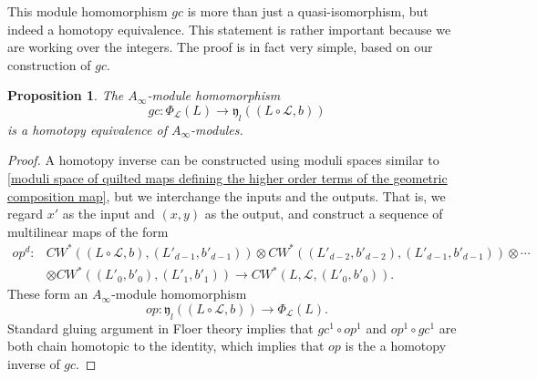 \documentclass{amsart}
\newtheorem{proposition}[theorem]{Proposition}
\numberwithin{equation}{section}
\numberwithin{figure}{section}
\begin{document}
	This module homomorphism $gc$ is more than just a quasi-isomorphism, but indeed a homotopy equivalence. This statement is rather important because we are working over the integers. The proof is in fact very simple, based on our construction of $gc$. \par

\begin{proposition}
	The $A_{\infty}$-module homomorphism
\begin{equation*}
gc: \Phi_{\mathcal{L}}(L) \to \mathfrak{y}_{l}((L \circ \mathcal{L}, b))
\end{equation*}
is a homotopy equivalence of $A_{\infty}$-modules.
\end{proposition}
\begin{proof}
	A homotopy inverse can be constructed using moduli spaces similar to \eqref{moduli space of quilted maps defining the higher order terms of the geometric composition map}, but we interchange the inputs and the outputs. That is, we regard $x'$ as the input and $(x, y)$ as the output, and construct a sequence of multilinear maps of the form
\begin{equation}
\begin{split}
op^{d}: & CW^{*}((L \circ \mathcal{L}, b), (L'_{d-1}, b'_{d-1})) \otimes CW^{*}((L'_{d-2}, b'_{d-2}), (L'_{d-1}, b'_{d-1})) \otimes \cdots \\
&\otimes CW^{*}((L'_{0}, b'_{0}), (L'_{1}, b'_{1})) \to CW^{*}(L, \mathcal{L}, (L'_{0}, b'_{0})).
\end{split}
\end{equation}
These form an $A_{\infty}$-module homomorphism
\begin{equation*}
op: \mathfrak{y}_{l}((L \circ \mathcal{L}, b)) \to \Phi_{\mathcal{L}}(L).
\end{equation*}
Standard gluing argument in Floer theory implies that $gc^{1} \circ op^{1}$ and $op^{1} \circ gc^{1}$ are both chain homotopic to the identity, which implies that $op$ is the a homotopy inverse of $gc$. \par
\end{proof}
\end{document}
